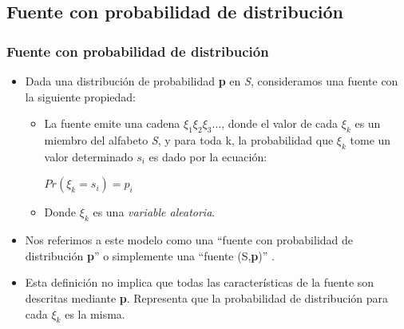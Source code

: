 \documentclass{beamer}
\begin{document}

\subsection{Fuente con probabilidad de distribución}
\begin{frame}\frametitle{Fuente con probabilidad de distribución}      \small

\begin{itemize}
\item Dada una distribución de probabilidad \textbf{p} en \textit{S}, consideramos una fuente con la siguiente propiedad:

\begin{itemize}
\item La fuente emite una cadena $\xi_1 \xi_2 \xi_3 \ldots $, donde el valor de cada $\xi_k$ es un miembro del alfabeto \textit{S}, y para toda k, la probabilidad que $\xi_k$ tome un valor determinado $s_i$ es dado por la ecuación:

\begin{center}
$Pr(\xi_k =s_i)=p_i$
\end{center}

\item Donde $\xi_k$ es una \textit{variable aleatoria}.

\end{itemize}


\item  Nos referimos a este modelo como una ``fuente con probabilidad de distribución \textbf{p}'' o simplemente una ``fuente (S,\textbf{p})'' . 

\item  Esta definición no implica que todas las características de la fuente son descritas mediante \textbf{p}. Representa que la probabilidad de distribución para cada $\xi_k$ es la misma.
\end{itemize}


\end{frame}

\end{document}

